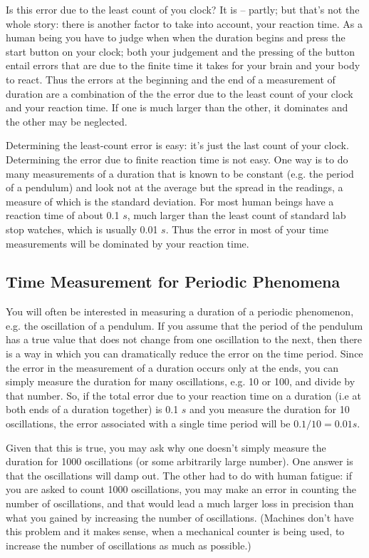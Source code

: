 Is this error due to the least count of you clock? It is -- partly; but that's not the whole story: there is another factor to take into account, your reaction time. As a human being you have to judge when when the duration begins and press the start button on your clock; both your judgement and the pressing of the button entail errors that are due to the finite time it takes for your brain and your body to react. Thus the errors at the beginning and the end of a measurement of duration are a combination of the the error due to the least count of your clock and your reaction time. If one is much larger than the other, it dominates and the other may be neglected. 

Determining the least-count error is easy: it's just the last count of your clock. Determining the error due to finite reaction time is not easy. One way is to do many measurements of a duration that is known to be constant (e.g. the period of a pendulum) and look not at the average but the spread in the readings, a measure of which is the standard deviation. For most human beings have a reaction time of about 0.1 $s$, much larger than the least count of standard lab stop watches, which is usually 0.01 $s$. Thus the error in most of your time measurements will be dominated by your reaction time. 

\subsection{Time Measurement for Periodic Phenomena}

You will often be interested in measuring a duration of a periodic phenomenon, e.g. the oscillation of a pendulum. If you assume that the period of the pendulum has a true value that does not change from one oscillation to the next, then there is a way in which you can dramatically reduce the error on the time period. Since the error in the measurement of a duration occurs only at the ends, you can simply measure the duration for many oscillations, e.g. 10 or 100, and divide by that number. So, if the total error due to your reaction time on a duration (i.e at both ends of a duration together) is 0.1 $s$ and you measure the duration for 10 oscillations, the error associated with a single time period will be $0.1/10 = 0.01 s$.

Given that this is true, you may ask why one doesn't simply measure the duration for 1000 oscillations (or some arbitrarily large number). One answer is that the oscillations will damp out. The other had to do with human fatigue: if you are asked to count 1000 oscillations, you may make an error in counting the number of oscillations, and that would lead a much larger loss in precision than what you gained by increasing the number of oscillations. (Machines don't have this problem and it makes sense, when a mechanical counter is being used, to increase the number of oscillations as much as possible.) 

